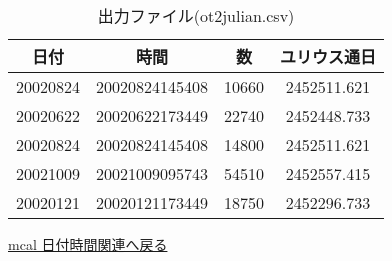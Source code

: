 \begin{table}[hbt]
\begin{center}
 \caption{出力ファイル(ot2julian.csv)}
  \begin{tabular}{|c|c|c|c|} \hline
日付&時間&数&ユリウス通日\\ \hline\hline
20020824&20020824145408&10660&2452511.621\\ \hline
20020622&20020622173449&22740&2452448.733\\ \hline
20020824&20020824145408&14800&2452511.621\\ \hline
20021009&20021009095743&54510&2452557.415\\ \hline
20020121&20020121173449&18750&2452296.733\\ \hline
  \end{tabular}
  \end{center}
\end{table}

\href{run:hizuke.pdf}{mcal 日付時間関連へ戻る}\\
%

